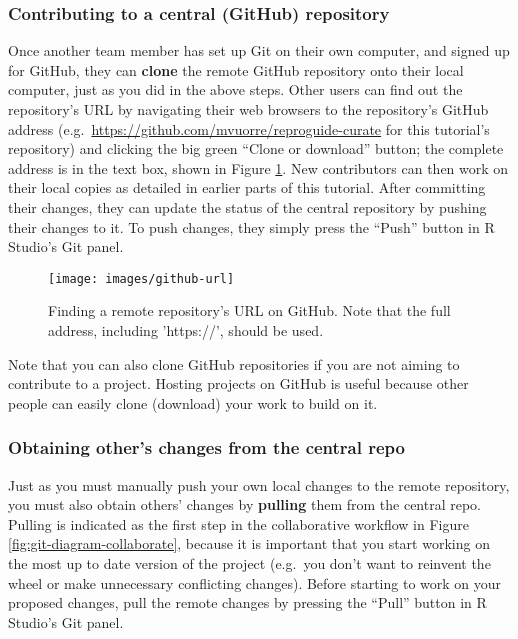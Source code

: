 \documentclass[
  american,
  ,doc,floatsintext]{apa6}
\begin{document}
\hypertarget{contributing-to-a-central-github-repository}{%
\subsubsection{Contributing to a central (GitHub) repository}\label{contributing-to-a-central-github-repository}}

Once another team member has set up Git on their own computer, and signed up for GitHub, they can \textbf{clone} the remote GitHub repository onto their local computer, just as you did in the above steps. Other users can find out the repository's URL by navigating their web browsers to the repository's GitHub address (e.g.~\url{https://github.com/mvuorre/reproguide-curate} for this tutorial's repository) and clicking the big green ``Clone or download'' button; the complete address is in the text box, shown in Figure \ref{fig:url-from-github}. New contributors can then work on their local copies as detailed in earlier parts of this tutorial. After committing their changes, they can update the status of the central repository by pushing their changes to it. To push changes, they simply press the ``Push'' button in R Studio's Git panel.

\begin{figure}

{\centering \texttt{[image: images/github-url]} 

}

\caption{Finding a remote repository's URL on GitHub. Note that the full address, including 'https://', should be used.}\label{fig:url-from-github}
\end{figure}

Note that you can also clone GitHub repositories if you are not aiming to contribute to a project. Hosting projects on GitHub is useful because other people can easily clone (download) your work to build on it.

\hypertarget{obtaining-others-changes-from-the-central-repo}{%
\subsubsection{Obtaining other's changes from the central repo}\label{obtaining-others-changes-from-the-central-repo}}

Just as you must manually push your own local changes to the remote repository, you must also obtain others' changes by \textbf{pulling} them from the central repo. Pulling is indicated as the first step in the collaborative workflow in Figure \ref{fig:git-diagram-collaborate}, because it is important that you start working on the most up to date version of the project (e.g.~you don't want to reinvent the wheel or make unnecessary conflicting changes). Before starting to work on your proposed changes, pull the remote changes by pressing the ``Pull'' button in R Studio's Git panel.
\end{document}
